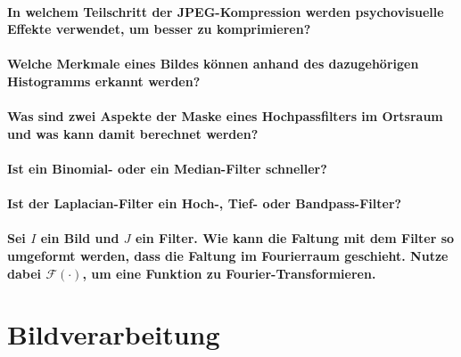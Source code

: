 		\paragraph{In welchem Teilschritt der JPEG-Kompression werden psychovisuelle Effekte verwendet, um besser zu komprimieren?}

		\paragraph{Welche Merkmale eines Bildes können anhand des dazugehörigen Histogramms erkannt werden?}

		\paragraph{Was sind zwei Aspekte der Maske eines Hochpassfilters im Ortsraum und was kann damit berechnet werden?}

		\paragraph{Ist ein Binomial- oder ein Median-Filter schneller?}

		\paragraph{Ist der Laplacian-Filter ein Hoch-, Tief- oder Bandpass-Filter?}

		\paragraph{Sei \(I\) ein Bild und \(J\) ein Filter. Wie kann die Faltung mit dem Filter so umgeformt werden, dass die Faltung im Fourierraum geschieht. Nutze dabei \( \mathcal{F}(\cdot) \), um eine Funktion zu Fourier-Transformieren.}

	\section{Bildverarbeitung}
